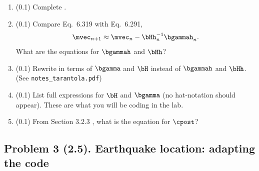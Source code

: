 \documentclass[11pt,titlepage,fleqn]{article}
\begin{document}
\begin{enumerate}
\begin{enumerate}
\vspace{1cm}

\item (0.1) Complete .

\item (0.1) Compare Eq.~6.319 with Eq.~6.291,
%
\begin{equation}
\mvec_{n+1} \approx \mvec_{n} - \bHh^{-1}_n \bgammah_n.
\label{mn}
\end{equation}
%
What are the equations for $\bgammah$ and $\bHh$?

\vspace{1cm}

\item (0.1) Rewrite  in terms of $\bgamma$ and $\bH$ instead of $\bgammah$ and $\bHh$. \\ (See \verb+notes_tarantola.pdf+)

\vspace{1cm}

\item (0.1) List full expressions for $\bH$ and $\bgamma$ (no hat-notation should appear). These are what you will be coding in the lab.

\vspace{1cm}

\item (0.1) From Section 3.2.3 \citep{Tarantola2005}, what is the equation for $\cpost$?

\vspace{1cm}

\end{enumerate}

\end{enumerate}


\subsection*{Problem 3 (2.5). Earthquake location: adapting the code}
\end{document}
